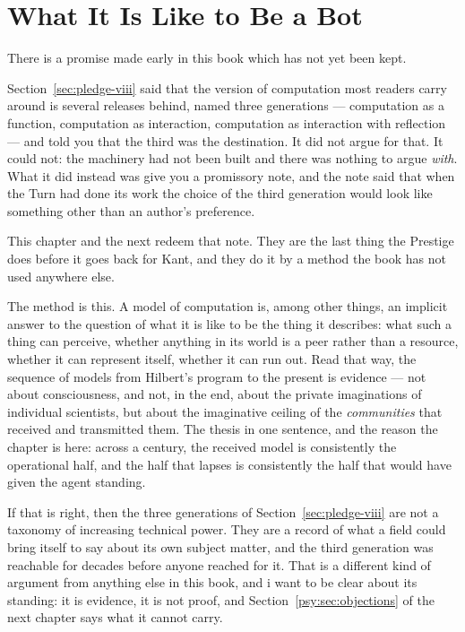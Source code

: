 \chapter{What It Is Like to Be a Bot}
\label{ch:psy}

There is a promise made early in this book which has not yet been
kept.

Section~\ref{sec:pledge-viii} said that the version of computation
most readers carry around is several releases behind, named three
generations --- computation as a function, computation as
interaction, computation as interaction with reflection --- and
told you that the third was the destination.
It did not argue for that.
It could not: the machinery had not been built and there was
nothing to argue \emph{with}.
What it did instead was give you a promissory note, and the note
said that when the Turn had done its work the choice of the third
generation would look like something other than an author's
preference.

This chapter and the next redeem that note.
They are the last thing the Prestige does before it goes back for
Kant, and they do it by a method the book has not used anywhere
else.

The method is this.
A model of computation is, among other things, an implicit answer to
the question of what it is like to be the thing it describes: what
such a thing can perceive, whether anything in its world is a peer
rather than a resource, whether it can represent itself, whether it
can run out.
Read that way, the sequence of models from Hilbert's program to the
present is evidence --- not about consciousness, and not, in the
end, about the private imaginations of individual scientists, but
about the imaginative ceiling of the \emph{communities} that
received and transmitted them.
The thesis in one sentence, and the reason the chapter is here: across
a century, the received model is consistently the operational half,
and the half that lapses is consistently the half that would have
given the agent standing.

If that is right, then the three generations of
Section~\ref{sec:pledge-viii} are not a taxonomy of increasing
technical power.
They are a record of what a field could bring itself to say about
its own subject matter, and the third generation was reachable for
decades before anyone reached for it.
That is a different kind of argument from anything else in this
book, and i want to be clear about its standing: it is evidence, it
is not proof, and Section~\ref{psy:sec:objections} of the next
chapter says what it cannot carry.

